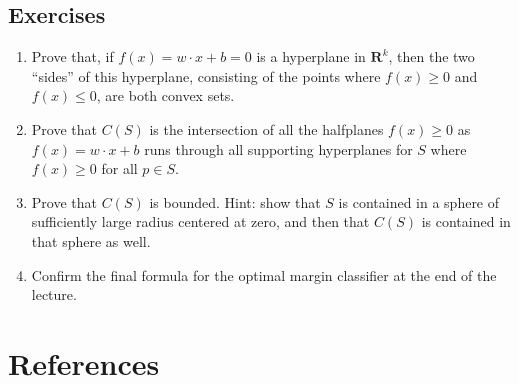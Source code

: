 \documentclass[
  oneside]{scrbook}
\begin{document}
\hypertarget{sec:exercises}{%
\section{Exercises}\label{sec:exercises}}

\begin{enumerate}
\def\labelenumi{\arabic{enumi}.}
\item
  Prove that, if \(f(x)=w\cdot x+b=0\) is a hyperplane in
  \(\mathbf{R}^{k}\), then the two ``sides'' of this hyperplane,
  consisting of the points where \(f(x)\ge 0\) and \(f(x)\le 0\), are
  both convex sets.
\item
  Prove that \(C(S)\) is the intersection of all the halfplanes
  \(f(x)\ge 0\) as \(f(x)=w\cdot x+b\) runs through all supporting
  hyperplanes for \(S\) where \(f(x)\ge 0\) for all \(p\in S\).
\item
  Prove that \(C(S)\) is bounded. Hint: show that \(S\) is contained in
  a sphere of sufficiently large radius centered at zero, and then that
  \(C(S)\) is contained in that sphere as well.
\item
  Confirm the final formula for the optimal margin classifier at the end
  of the lecture.
\end{enumerate}

\hypertarget{bibliography}{%
\chapter*{References}\label{bibliography}}
\end{document}
